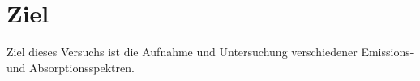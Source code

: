 \section{Ziel}
\label{sec:Ziel}

Ziel dieses Versuchs ist die Aufnahme und Untersuchung verschiedener Emissions- und
Absorptionsspektren.
